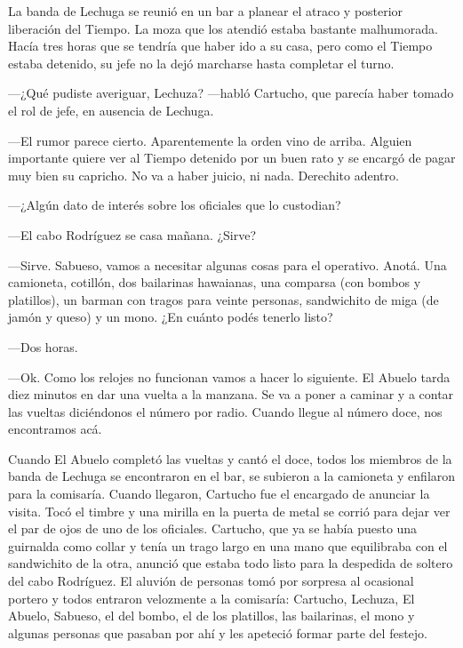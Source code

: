 \documentclass[11pt,twoside,openright,a5paper]{book}
\begin{document}
La banda de Lechuga se reunió en un bar a planear el atraco y posterior liberación del Tiempo. La moza que los atendió estaba bastante malhumorada. Hacía tres horas que se tendría que haber ido a su casa, pero como el Tiempo estaba detenido, su jefe no la dejó marcharse hasta completar el turno.

---¿Qué pudiste averiguar, Lechuza? ---habló Cartucho, que parecía haber tomado el rol de jefe, en ausencia de Lechuga.

---El rumor parece cierto. Aparentemente la orden vino de arriba. Alguien importante quiere ver al Tiempo detenido por un buen rato y se encargó de pagar muy bien su capricho. No va a haber juicio, ni nada. Derechito adentro.

---¿Algún dato de interés sobre los oficiales que lo custodian?

---El cabo Rodríguez se casa mañana. ¿Sirve?

---Sirve. Sabueso, vamos a necesitar algunas cosas para el operativo. Anotá. Una camioneta, cotillón, dos bailarinas hawaianas, una comparsa (con bombos y platillos), un barman con tragos para veinte personas,  sandwichito de miga (de jamón y queso) y un mono. ¿En cuánto podés tenerlo listo?

---Dos horas.

---Ok. Como los relojes no funcionan vamos a hacer lo siguiente. El Abuelo tarda diez  minutos en dar una vuelta a la manzana. Se va a poner a caminar y a contar las vueltas diciéndonos el número por radio. Cuando llegue al número doce, nos encontramos acá.

\vspace{0.5cm}

Cuando El Abuelo completó las vueltas y cantó el doce, todos los miembros de la banda de Lechuga se encontraron en el bar, se subieron a la camioneta y enfilaron para la comisaría.
Cuando llegaron, Cartucho fue el encargado de anunciar la visita. Tocó el timbre y una mirilla en la puerta de metal se corrió para dejar ver el par de ojos de uno de los oficiales. Cartucho, que ya se había puesto una guirnalda como collar y tenía un trago largo en una mano que equilibraba con el sandwichito de la otra, anunció que estaba todo listo para la despedida de soltero del cabo Rodríguez. El aluvión de personas tomó por sorpresa al ocasional portero y todos entraron velozmente a la comisaría: Cartucho, Lechuza, El Abuelo, Sabueso, el del bombo, el de los platillos, las bailarinas, el mono y algunas personas que pasaban por ahí y les apeteció formar parte del festejo.
\end{document}
